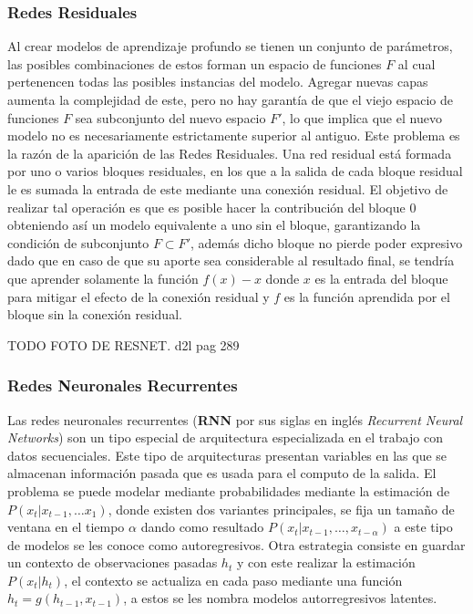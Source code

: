 \subsubsection{Redes Residuales}

Al crear modelos de aprendizaje profundo se tienen un conjunto de parámetros, las posibles combinaciones 
de estos forman un espacio de funciones $F$ al cual pertenencen todas las posibles instancias del modelo.
Agregar nuevas capas aumenta la complejidad de este, pero no hay garantía de que el viejo espacio 
de funciones $F$ sea subconjunto del nuevo espacio $F'$, lo que implica que el nuevo modelo no es necesariamente
estrictamente superior al antiguo. Este problema es la razón de la aparición de las Redes Residuales. 
Una red residual está formada por 
uno o varios bloques residuales, en los que a la salida de cada bloque residual le es sumada la entrada de 
este mediante una conexión residual.
El objetivo de realizar tal operación es que es posible hacer la contribución del bloque 0 obteniendo así
un modelo equivalente a uno sin el bloque, garantizando la condición de subconjunto $F \subset F'$, además 
dicho bloque no pierde poder expresivo dado que en caso de que su aporte sea considerable al resultado final, 
se tendría que aprender solamente la función $f(x) - x$ donde $x$ es la entrada del bloque para mitigar el 
efecto de la conexión residual y $f$ es la función aprendida por el bloque sin la conexión residual.

TODO FOTO DE RESNET. d2l pag 289

\subsubsection{Redes Neuronales Recurrentes}

Las redes neuronales recurrentes (\textbf{RNN} por sus siglas en inglés \emph{Recurrent Neural Networks}) son
un tipo especial de arquitectura especializada en el trabajo con datos secuenciales. Este tipo de arquitecturas
presentan variables en las que se almacenan información pasada que es usada para el computo de la salida. El 
problema se puede modelar mediante probabilidades mediante la estimación de $P(x_t | x_{t-1}, \dots x_{1})$,
donde existen dos variantes principales, se fija un tamaño de ventana en el tiempo $\alpha$ dando como resultado
$P(x_t | x_{t-1}, \dots, x_{t-\alpha})$ a este tipo de modelos se les conoce como autoregresivos. Otra estrategia
consiste en guardar un contexto de observaciones pasadas $h_t$ y con este realizar la estimación $P(x_t | h_t)$,
el contexto se actualiza en cada paso mediante una función $h_t = g(h_{t-1}, x_{t-1})$, a estos se les nombra
modelos autorregresivos latentes. 

